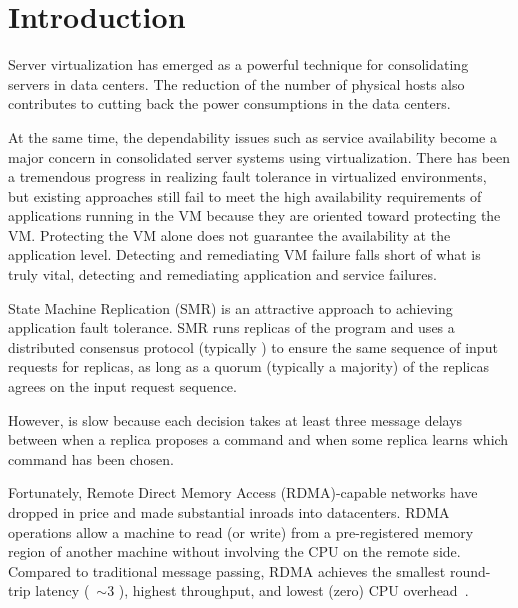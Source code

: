 \section{Introduction} \label{sec:intro}


Server virtualization has emerged as a powerful technique for consolidating servers in 
data centers. The reduction of the number of physical hosts also contributes to cutting 
back the power consumptions in the data centers.


At the same time, the dependability issues such as service availability become a major concern 
in consolidated server systems using virtualization. There has been a tremendous progress in 
realizing fault tolerance in virtualized environments, but existing approaches still fail to 
meet the high availability requirements of applications running in the VM because they are oriented 
toward protecting the VM. Protecting the VM alone does not guarantee the availability at the 
application level. Detecting and remediating VM failure falls short of what is truly vital, 
detecting and remediating application and service failures.

State Machine Replication (SMR) is an attractive approach to achieving application fault tolerance. 
SMR runs replicas of the program and uses a distributed consensus protocol 
(typically \paxos) to ensure the same sequence of input requests for replicas, as long as a 
quorum (typically a majority) of the replicas agrees on the input request sequence.

However, \paxos is slow because each decision takes at least three message delays between when 
a replica proposes a command and when some replica learns which command has been chosen.

Fortunately, Remote Direct Memory Access (RDMA)-capable networks have dropped in price and made 
substantial inroads into datacenters. RDMA operations allow a machine to read (or write) from a 
pre-registered memory region of another machine without involving the CPU on the remote side. 
Compared to traditional message passing, RDMA achieves the smallest round-trip latency 
(~$\sim$3 \us), highest throughput, and lowest (zero) CPU overhead~\cite{pilaf:usenix14}.

